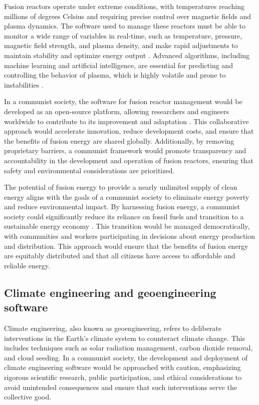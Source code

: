 Fusion reactors operate under extreme conditions, with temperatures reaching millions of degrees Celsius and requiring precise control over magnetic fields and plasma dynamics. The software used to manage these reactors must be able to monitor a wide range of variables in real-time, such as temperature, pressure, magnetic field strength, and plasma density, and make rapid adjustments to maintain stability and optimize energy output \cite[pp.~220-228]{freidberg2008plasma}. Advanced algorithms, including machine learning and artificial intelligence, are essential for predicting and controlling the behavior of plasma, which is highly volatile and prone to instabilities \cite[pp.~310-318]{kulsrud2005fusion}.

In a communist society, the software for fusion reactor management would be developed as an open-source platform, allowing researchers and engineers worldwide to contribute to its improvement and adaptation \cite[pp.~88-94]{wesson2011tokamaks}. This collaborative approach would accelerate innovation, reduce development costs, and ensure that the benefits of fusion energy are shared globally. Additionally, by removing proprietary barriers, a communist framework would promote transparency and accountability in the development and operation of fusion reactors, ensuring that safety and environmental considerations are prioritized.

The potential of fusion energy to provide a nearly unlimited supply of clean energy aligns with the goals of a communist society to eliminate energy poverty and reduce environmental impact. By harnessing fusion energy, a communist society could significantly reduce its reliance on fossil fuels and transition to a sustainable energy economy \cite[pp.~180-188]{mazzucato2015entrepreneurial}. This transition would be managed democratically, with communities and workers participating in decisions about energy production and distribution. This approach would ensure that the benefits of fusion energy are equitably distributed and that all citizens have access to affordable and reliable energy.

\subsection{Climate engineering and geoengineering software}

Climate engineering, also known as geoengineering, refers to deliberate interventions in the Earth’s climate system to counteract climate change. This includes techniques such as solar radiation management, carbon dioxide removal, and cloud seeding. In a communist society, the development and deployment of climate engineering software would be approached with caution, emphasizing rigorous scientific research, public participation, and ethical considerations to avoid unintended consequences and ensure that such interventions serve the collective good.

